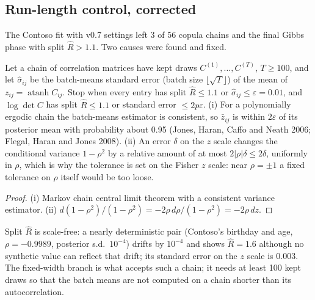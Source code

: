 \subsection{Run-length control, corrected}
The Contoso fit with v0.7 settings left 3 of 56 copula chains and the final Gibbs phase with split $\hat R>1.1$. Two causes were found and fixed.

\begin{proposition}\label{prop:fixedwidth}
Let a chain of correlation matrices have kept draws $C^{(1)},\dots,C^{(T)}$, $T\ge100$, and let $\hat\sigma_{ij}$ be the batch-means standard error (batch size $\lfloor\sqrt T\rfloor$) of the mean of $z_{ij}=\operatorname{atanh}C_{ij}$. Stop when every entry has split $\hat R\le1.1$ or $\hat\sigma_{ij}\le\varepsilon=0.01$, and $\log\det C$ has split $\hat R\le1.1$ or standard error $\le2p\varepsilon$. (i) For a polynomially ergodic chain the batch-means estimator is consistent, so $\bar z_{ij}$ is within $2\varepsilon$ of its posterior mean with probability about 0.95 (Jones, Haran, Caffo and Neath 2006; Flegal, Haran and Jones 2008). (ii) An error $\delta$ on the $z$ scale changes the conditional variance $1-\rho^2$ by a relative amount of at most $2|\rho|\delta\le2\delta$, uniformly in $\rho$, which is why the tolerance is set on the Fisher $z$ scale: near $\rho=\pm1$ a fixed tolerance on $\rho$ itself would be too loose.
\end{proposition}
\begin{proof}
(i) Markov chain central limit theorem with a consistent variance estimator. (ii) $d(1-\rho^2)/(1-\rho^2)=-2\rho\,d\rho/(1-\rho^2)=-2\rho\,dz$.
\end{proof}
\noindent Split $\hat R$ is scale-free: a nearly deterministic pair (Contoso's birthday and age, $\rho=-0.9989$, posterior s.d.\ $10^{-4}$) drifts by $10^{-4}$ and shows $\hat R=1.6$ although no synthetic value can reflect that drift; its standard error on the $z$ scale is 0.003. The fixed-width branch is what accepts such a chain; it needs at least 100 kept draws so that the batch means are not computed on a chain shorter than its autocorrelation.

